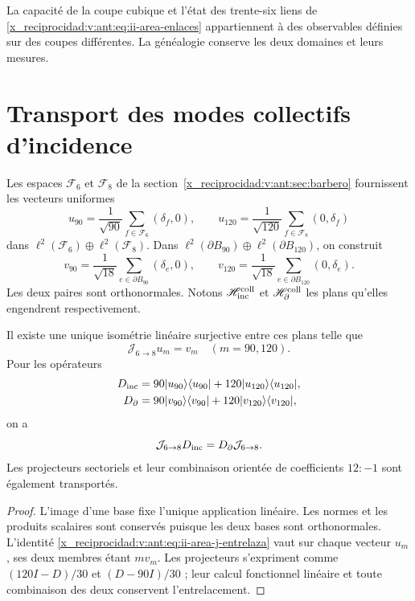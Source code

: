 La capacité de la coupe cubique et l'état des trente-six liens
de \eqref{x_reciprocidad:v:ant:eq:ii-area-enlaces} appartiennent à des observables définies sur
des coupes différentes. La généalogie conserve les deux domaines et leurs mesures.

\section{Transport des modes collectifs d'incidence}
\label{x_reciprocidad:v:ant:sec:ii-area-transporte-colectivo}

Les espaces \(\mathcal F_6\) et \(\mathcal F_8\) de la
section~\ref{x_reciprocidad:v:ant:sec:barbero} fournissent les vecteurs uniformes
\[
 u_{90}=\frac1{\sqrt{90}}\sum_{f\in\mathcal F_6}(\delta_f,0),
 \qquad
 u_{120}=\frac1{\sqrt{120}}\sum_{f\in\mathcal F_8}(0,\delta_f)
\]
dans \(\ell^2(\mathcal F_6)\oplus\ell^2(\mathcal F_8)\).
Dans \(\ell^2(\partial B_{90})\oplus\ell^2(\partial B_{120})\),
on construit
\[
 v_{90}=\frac1{\sqrt{18}}\sum_{e\in\partial B_{90}}(\delta_e,0),
 \qquad
 v_{120}=\frac1{\sqrt{18}}\sum_{e\in\partial B_{120}}(0,\delta_e).
\]
Les deux paires sont orthonormales. Notons
\(\mathscr H_{\rm inc}^{\rm coll}\) et
\(\mathscr H_\partial^{\rm coll}\) les plans qu'elles engendrent respectivement.

\begin{theorem}
\label{x_reciprocidad:v:ant:thm:ii-area-entrelazamiento-colectivo}
Il existe une unique isométrie linéaire surjective entre ces plans telle que
\begin{equation}
 \mathcal J_{6\to8}u_m=v_m\quad(m=90,120).
 \label{x_reciprocidad:v:ant:eq:ii-area-j-colectivo}
\end{equation}
Pour les opérateurs
\[
 \begin{aligned}
 D_{\rm inc}&=90|u_{90}\rangle\langle u_{90}|
             +120|u_{120}\rangle\langle u_{120}|,\\
 D_\partial&=90|v_{90}\rangle\langle v_{90}|
             +120|v_{120}\rangle\langle v_{120}|,
 \end{aligned}
\]
on a
\begin{equation}
 \mathcal J_{6\to8}D_{\rm inc}
 =D_\partial\mathcal J_{6\to8}.
 \label{x_reciprocidad:v:ant:eq:ii-area-j-entrelaza}
\end{equation}
Les projecteurs sectoriels et leur combinaison orientée de coefficients
\(12:-1\) sont également transportés.
\end{theorem}
\begin{proof}
L'image d'une base fixe l'unique application linéaire. Les normes et les
produits scalaires sont conservés puisque les deux bases sont orthonormales.
L'identité \eqref{x_reciprocidad:v:ant:eq:ii-area-j-entrelaza} vaut sur chaque vecteur
\(u_m\), ses deux membres étant \(m v_m\). Les projecteurs
s'expriment comme \((120I-D)/30\) et \((D-90I)/30\) ; leur calcul fonctionnel
linéaire et toute combinaison des deux conservent l'entrelacement.
\end{proof}

